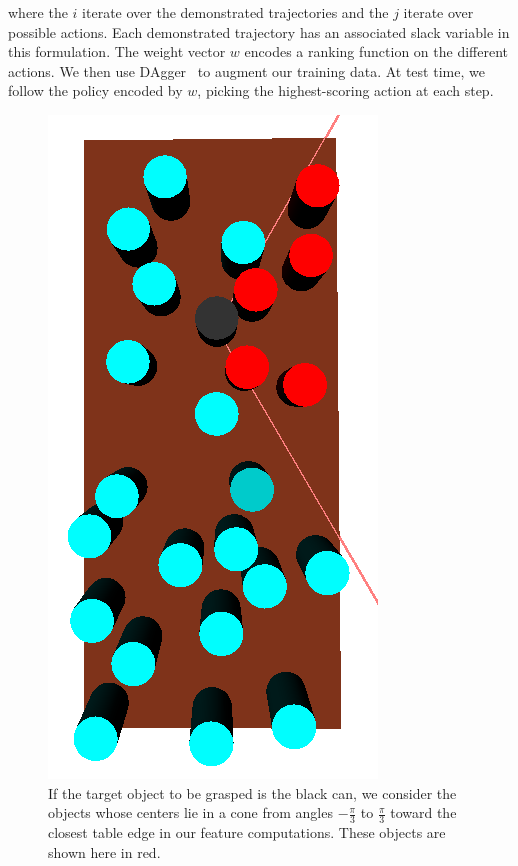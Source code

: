 where the $i$ iterate over the demonstrated trajectories and the $j$ iterate over possible actions. Each
demonstrated trajectory has an associated slack variable in this formulation.
The weight vector $w$ encodes a ranking function on the different actions.
We then use {\sc DAgger}~\cite{dagger} to augment our training data. At test time, we follow the policy encoded by
$w$, picking the highest-scoring action at each step.

\begin{figure}[t]
  \centering
    \includegraphics[scale=0.3,angle=90]{images/feature_cone.png}
  \caption{\small{If the target object to be grasped is the black can, we consider the objects
whose centers lie in a cone from angles $-\frac{\pi}{3}$ to $\frac{\pi}{3}$ toward the closest table edge in
our feature computations. These objects are shown here in red.}}
  \label{fig:cone}
\end{figure}

